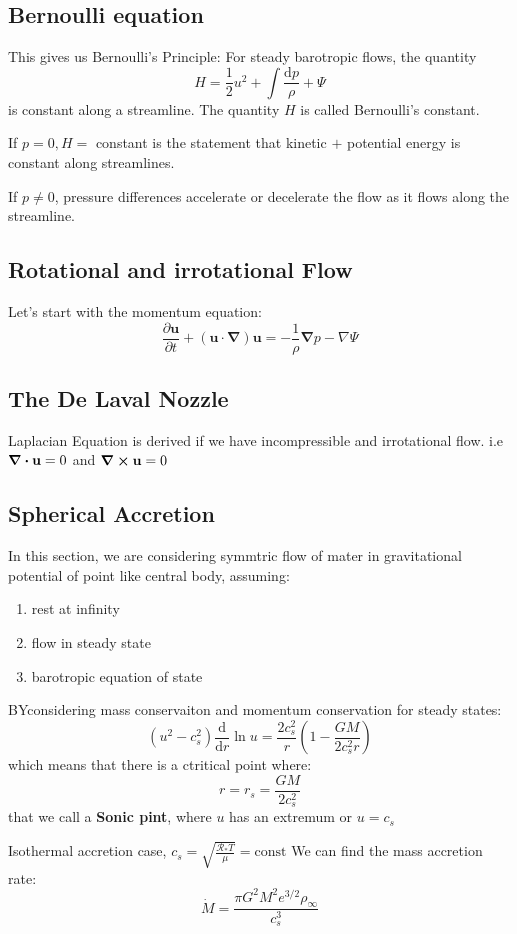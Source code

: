\documentclass[12pt,a4paper]{article}
\begin{document}
\subsection{Bernoulli equation}
This gives us Bernoulli's Principle: For steady barotropic flows, the quantity
$$
H=\frac{1}{2} u^2+\int \frac{\mathrm{d} p}{\rho}+\Psi
$$
is constant along a streamline. The quantity $H$ is called Bernoulli's constant.

If $p=0, H=$ constant is the statement that kinetic $+$ potential energy is constant along streamlines.

If $p \neq 0$, pressure differences accelerate or decelerate the flow as it flows along the streamline.
\subsection{Rotational and irrotational Flow}
Let's start with the momentum equation:
$$
\frac{\partial \mathbf{u}}{\partial t}+(\mathbf{u} \cdot \boldsymbol{\nabla}) \mathbf{u}=-\frac{1}{\rho} \boldsymbol{\nabla} p-\nabla \Psi
$$

\subsection{The De Laval Nozzle}
Laplacian Equation is derived if we have incompressible and irrotational flow. i.e $\div{\vb{u}=0}$ and $\curl{\vb{u}}=0$

\subsection{Spherical Accretion}
In this section, we are considering symmtric flow of mater in gravitational potential of point like central body, assuming:
\begin{enumerate}
    \item rest at infinity
    \item flow in steady state
    \item barotropic equation of state
\end{enumerate}
BYconsidering mass conservaiton and momentum conservation for steady states:
$$
\left(u^2-c_s^2\right) \frac{\mathrm{d}}{\mathrm{d} r} \ln u=\frac{2 c_s^2}{r}\left(1-\frac{G M}{2 c_s^2 r}\right)
$$
which means that there is a ctritical point where:
$$
r=r_s=\frac{G M}{2 c_s^2}
$$
that we call a \textbf{Sonic pint}, where $u$ has an extremum or $u=c_s$\\

\begin{example}
    {Isothermal accretion case, $c_s=\sqrt{\frac{\mathcal{R}_* T}{\mu}}=\mathrm{const}$}
    {We can find the mass accretion rate:
    $$
    \dot{M}=\frac{\pi G^2 M^2 e^{3 / 2} \rho_{\infty}}{c_s^3}
    $$
    }
\end{example}
\end{document}
